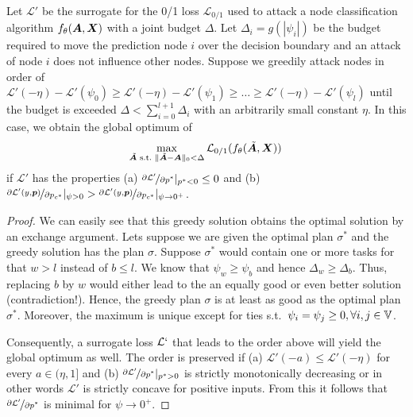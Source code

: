 \documentclass[sigconf, review]{acmart}
\newcommand{\adj}{\mA}
\newcommand{\features}{\mX}
\begin{document}
\begin{proposition}\label{proposition:goodsurrogate}
  Let \(\mathcal{L}'\) be the surrogate for the 0/1 loss \(\mathcal{L}_{0/1}\) used to attack a node classification algorithm \(f_{\theta}(\adj, \features)\) with a joint budget \(\Delta\). Let \(\Delta_i = g (|\psi_i|)\) be the budget required to move the prediction node \(i\) over the decision boundary and an attack of node \(i\) does not influence other nodes.
  Suppose we greedily attack nodes in order of \(\mathcal{L}'(-\eta) - \mathcal{L}'(\psi_0) \ge \mathcal{L}'(-\eta) - \mathcal{L}'(\psi_1) \ge \dots \ge \mathcal{L}'(-\eta) - \mathcal{L}'(\psi_l)\) until the budget is exceeded \(\Delta < \sum_{i=0}^{l+1} \Delta_i\) with an arbitrarily small constant \(\eta\).
  In this case, we obtain the global optimum of
  \begin{equation}\label{eq:goodsurrogate}
    \max_{\tilde{\adj}\text{ s.t.\ }\|\tilde{\adj} - \adj\|_0 < \Delta} \mathcal{L}_{0/1}(f_{\theta}(\tilde{\adj}, \features))\,
  \end{equation}
  if \(\mathcal{L}'\) has the properties (a) \(\nicefrac{\partial \mathcal{L}'}{\partial p^*} |_{p^* < 0} \le 0\) and (b) \(\nicefrac{\partial \mathcal{L}'(y, {\bm{p}})}{\partial {p}_{c^*}} |_{\psi > 0}  > \nicefrac{\partial \mathcal{L}'(y, {\bm{p}})}{\partial {p}_{c^*}} |_{\psi \to 0^+}\).
\end{proposition}

\begin{proof}
  We can easily see that this greedy solution obtains the optimal solution by an exchange argument. Lets suppose we are given the optimal plan \(\sigma^*\) and the greedy solution has the plan \(\sigma\). Suppose \(\sigma^*\) would contain one or more tasks for that \(w > l\) instead of \(b \le l\). We know that \(\psi_w \ge \psi_b\) and hence \(\Delta_w \ge \Delta_b\). Thus, replacing \(b\) by \(w\) would either lead to the an equally good or even better solution (contradiction!). Hence, the greedy plan \(\sigma\) is at least as good as the optimal plan \(\sigma^*\). Moreover, the maximum is unique except for ties s.t.\ \(\psi_i = \psi_j \ge 0, \forall i, j \in {\mathbb{V}}\).

  Consequently, a surrogate loss \(\mathcal{L}`\) that leads to the order above will yield the global optimum as well. The order is preserved if (a) \(\mathcal{L}'(-a) \le \mathcal{L}'(-\eta)\) for every \(a \in (\eta,1]\) and (b) \(\nicefrac{\partial \mathcal{L}'}{\partial p^*}|_{p^* > 0}\) is strictly monotonically decreasing or in other words \(\mathcal{L}'\) is strictly concave for positive inputs. From this it follows that \(\nicefrac{\partial \mathcal{L}'}{\partial p^*}\) is minimal for \(\psi \to 0^+\).
\end{proof}
\end{document}
